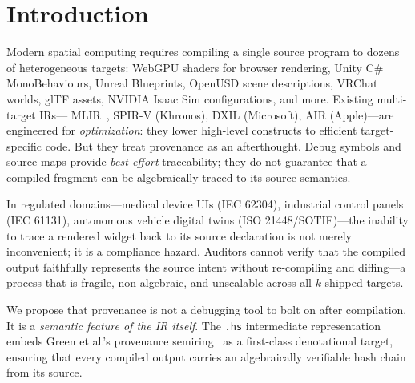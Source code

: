 \documentclass[sigconf,nonacm]{acmart}
\newcommand{\hscore}{\texttt{.hs}}
\begin{document}

\maketitle

\section{Introduction}
\label{sec:intro}

Modern spatial computing requires compiling a single source
program to dozens of heterogeneous targets: WebGPU shaders for
browser rendering, Unity C\# MonoBehaviours, Unreal Blueprints,
OpenUSD scene descriptions, VRChat worlds, glTF assets, NVIDIA
Isaac Sim configurations, and more. Existing multi-target IRs---
MLIR~\cite{mlir-lattner2020}, SPIR-V (Khronos), DXIL (Microsoft),
AIR (Apple)---are engineered for \emph{optimization}: they lower
high-level constructs to efficient target-specific code. But they
treat provenance as an afterthought. Debug symbols and source maps
provide \emph{best-effort} traceability; they do not guarantee
that a compiled fragment can be algebraically traced to its source
semantics.

In regulated domains---medical device UIs (IEC 62304), industrial
control panels (IEC 61131), autonomous vehicle digital twins
(ISO 21448/SOTIF)---the inability to trace a rendered widget back
to its source declaration is not merely inconvenient; it is a
compliance hazard. Auditors cannot verify that the compiled output
faithfully represents the source intent without re-compiling and
diffing---a process that is fragile, non-algebraic, and
unscalable across all $k$ shipped targets.

We propose that provenance is not a debugging tool to bolt on
after compilation. It is a \emph{semantic feature of the IR
itself}. The \hscore{} intermediate representation embeds Green
et al.'s provenance semiring~\cite{green-semiring2007} as a
first-class denotational target, ensuring that every compiled
output carries an algebraically verifiable hash chain from its
source.
\end{document}
